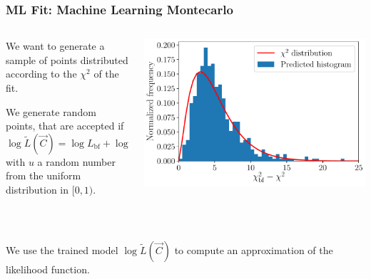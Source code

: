 \documentclass[mathserif, 10pt]{beamer}
\begin{document}
\begin{frame}\frametitle{ML Fit: Machine Learning Montecarlo}
    \begin{columns}
        \begin{column}{0.5\textwidth}
            We want to generate a sample of points distributed according to the $\chi^2$ of the fit.

            We generate random points, that are accepted if
            $$\log \tilde{L}(\vec{C}) = \log L_\mathrm{bf} + \log u\,,$$
            with $u$ a random number from the uniform distribution in $[0,1)$. %
        \end{column}
        \begin{column}{0.5\textwidth}
            \includegraphics[width=\columnwidth]{figures/hist_xgb.pdf}
        \end{column}
    \end{columns}

    ~

    We use the trained model $\log\tilde{L}(\vec{C})$ to compute an approximation of the likelihood function.

\end{frame}
\end{document}
